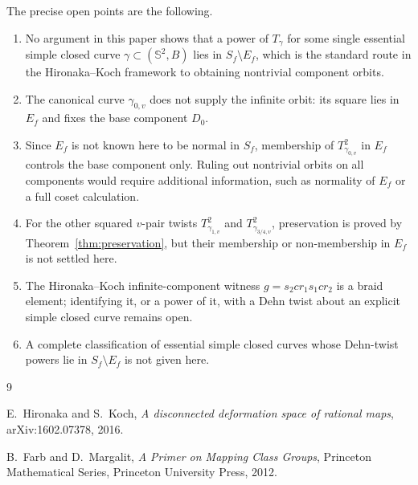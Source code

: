 \documentclass[12pt]{article}
\theoremstyle{definition}
\theoremstyle{remark}
\numberwithin{equation}{section}
\newcommand{\Sph}{\mathbb S}
\newcommand{\Sf}{S_f}
\newcommand{\Ef}{E_f}
\begin{document}
The precise open points are the following.
\begin{enumerate}[label=(\arabic*)]
\item No argument in this paper shows that a power of $T_{\gamma}$ for
some single essential simple closed curve
$\gamma\subset(\Sph^{2},B)$ lies in $\Sf\setminus\Ef$, which is the
standard route in the Hironaka--Koch framework to obtaining nontrivial
component orbits.
\item The canonical curve $\gamma_{0,v}$ does not supply the infinite
orbit: its square lies in $\Ef$ and fixes the base component $D_{0}$.
\item Since $\Ef$ is not known here to be normal in $\Sf$, membership of
$T_{\gamma_{0,v}}^{2}$ in $\Ef$ controls the base component only.
Ruling out nontrivial orbits on all components would require additional
information, such as normality of $\Ef$ or a full coset calculation.
\item For the other squared $v$-pair twists
$T_{\gamma_{1,v}}^{2}$ and $T_{\gamma_{3/4,v}}^{2}$, preservation is
proved by Theorem~\ref{thm:preservation}, but their membership or
non-membership in $\Ef$ is not settled here.
\item The Hironaka--Koch infinite-component witness
$g=s_{2}cr_{1}s_{1}cr_{2}$ is a braid element; identifying it, or a
power of it, with a Dehn twist about an explicit simple closed curve
remains open.
\item A complete classification of essential simple closed curves whose
Dehn-twist powers lie in $\Sf\setminus\Ef$ is not given here.
\end{enumerate}

\begin{thebibliography}{9}

E.~Hironaka and S.~Koch,
\emph{A disconnected deformation space of rational maps},
arXiv:1602.07378, 2016.

B.~Farb and D.~Margalit,
\emph{A Primer on Mapping Class Groups},
Princeton Mathematical Series, Princeton University Press, 2012.

\end{thebibliography}
\end{document}
